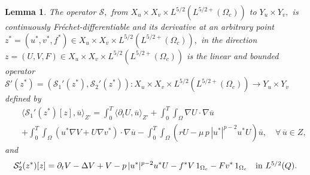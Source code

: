 \documentclass[10pt,a4paper]{amsart}
\newtheorem{lemma}{Lemma}
\begin{document}
\begin{lemma}\label{der-oper}
The operator $\mathcal{S},$ from ${X}_{u}  \times {X}_{v} \times L^{5/2}(L^{5/2+}(\Omega_c))$ to $Y_u \times Y_v,$ is continuously Fr\'echet-differentiable and its derivative at an arbitrary point 
$z^*=(u^*,v^*,f^*)\in {X}_{ u} \times {X}_{v} \times L^{5/2}(L^{5/2+}(\Omega_c)),$ in the direction $z=(U,V,F)\in {X}_{ u} 
\times{X}_{v}\times L^{5/2}(L^{5/2+}(\Omega_c)) $ is the linear and bounded operator $\mathcal{S}'(z^*)=(\mathcal{S}_1'(z^*),\mathcal{S}_2'(z^*)): {X}_{ u} 
\times{X}_{v}\times L^{5/2}(L^{5/2+}(\Omega_c)) \to Y_u \times Y_v$ defined by
\begin{eqnarray}\label{sss-2-u}
&&\langle\mathcal{S}_1'(z^*)[z],\overline{u}\rangle_{Z'}
=
\int_0^T\langle\partial_tU,\overline{u}\rangle_{Z'}
+\int_0^T\int_\Omega\nabla U\cdot\nabla\overline{u}
\nonumber\\
&&+\int_0^T\int_\Omega\left(u^*\nabla V+U\nabla v^*\right)\cdot\nabla\overline{u}
-\int_0^T\int_\Omega\left(rU - \mu \,p \, |u^*|^{p-2} u^* U\right)\overline{u},
\quad \forall\,\overline{u}\in Z,
\end{eqnarray}
and 
\begin{equation} \label{sss-2-v}
\mathcal{S}_2'(z^*)[z]=
\partial_tV-\Delta V+V-p \, |u^*|^{p-2} u^* U-f^*V\,1_{\Omega_c}-Fv^*\,1_{\Omega_c}
\quad \hbox{in $L^{5/2}(Q)$}.
\end{equation}
\end{lemma}
\end{document}
